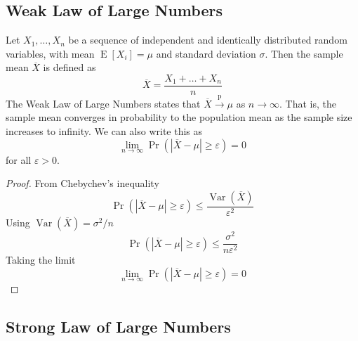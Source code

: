 \documentclass[11pt]{report} %
\begin{document}
\subsection{Weak Law of Large Numbers}

Let $X_{1}, \dots, X_{n}$ be a sequence of independent and identically distributed random variables, with mean $\operatorname{E}\left[X_{i}\right] = \mu$ and standard deviation $\sigma$. Then the sample mean $\overline{X}$ is defined as
\begin{equation}
\overline{X} = \dfrac{X_{1} + \dots + X_{n}}{n}
\end{equation}
The Weak Law of Large Numbers states that $\overline{X} \overset{\mathrm{p}}{\rightarrow} \mu$ as $n \rightarrow \infty$. That is, the sample mean converges in probability to the population mean as the sample size increases to infinity. We can also write this as
\begin{equation}
\lim_{n\rightarrow\infty}\operatorname{Pr}\left(\left|\overline{X} - \mu\right|\geq \varepsilon \right) = 0
\end{equation}
for all $\varepsilon > 0$.
\begin{proof}
From Chebychev's inequality
\begin{equation}
\operatorname{Pr}\left(\left|\overline{X} - \mu\right| \geq \varepsilon\right) \leq \dfrac{\operatorname{Var}\left(\overline{X}\right)}{\varepsilon^{2}}
\end{equation}
Using $\operatorname{Var}\left(\overline{X}\right) = \sigma^{2}/n$
\begin{equation}
\operatorname{Pr}\left(\left|\overline{X} - \mu\right| \geq \varepsilon\right) \leq \dfrac{\sigma^{2}}{n\varepsilon^{2}}
\end{equation}
Taking the limit
\begin{equation}
\lim_{n\rightarrow\infty}\operatorname{Pr}\left(\left|\overline{X} - \mu\right|\geq \varepsilon \right) = 0
\end{equation}
\end{proof}

\subsection{Strong Law of Large Numbers}
\end{document}
